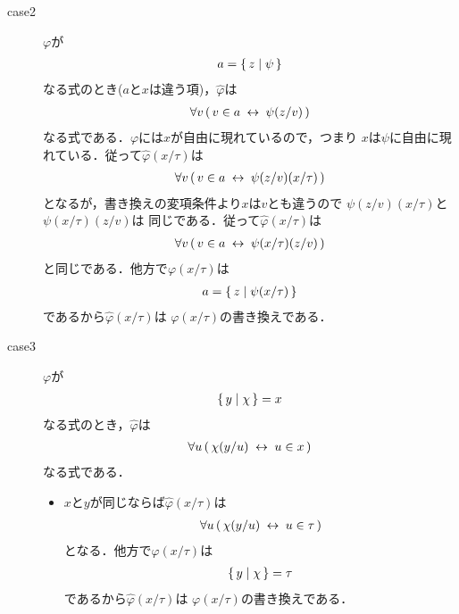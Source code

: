 \begin{metaprf}
\begin{description}
\begin{description}
					\item[case2] $\varphi$が
						\begin{align}
							a = \{\, z \mid \psi\, \}
						\end{align}
						なる式のとき($a$と$x$は違う項)，$\widehat{\varphi}$は
						\begin{align}
							\forall v\, (\, v \in a \hspace{0.25em}\leftrightarrow\hspace{0.25em} \psi(z/v)\, )
						\end{align}
						なる式である．$\varphi$には$x$が自由に現れているので，つまり
						$x$は$\psi$に自由に現れている．従って$\widehat{\varphi}(x/\tau)$は
						\begin{align}
							\forall v\, (\, v \in a \hspace{0.25em}\leftrightarrow\hspace{0.25em} \psi(z/v)(x/\tau)\, )
						\end{align}
						となるが，書き換えの変項条件より$x$は$v$とも違うので
						$\psi(z/v)(x/\tau)$と$\psi(x/\tau)(z/v)$は
						同じである．従って$\widehat{\varphi}(x/\tau)$は
						\begin{align}
							\forall v\, (\, v \in a \hspace{0.25em}\leftrightarrow\hspace{0.25em} \psi(x/\tau)(z/v)\, )
						\end{align}
						と同じである．他方で$\varphi(x/\tau)$は
						\begin{align}
							a = \{\, z \mid \psi(x/\tau)\, \}
						\end{align}
						であるから$\widehat{\varphi}(x/\tau)$は
						$\varphi(x/\tau)$の書き換えである．
					
					\item[case3] $\varphi$が
						\begin{align}
							\{\, y \mid \chi\, \} = x
						\end{align}
						なる式のとき，$\widehat{\varphi}$は
						\begin{align}
							\forall u\, (\, \chi(y/u) \hspace{0.25em}\leftrightarrow\hspace{0.25em} u \in x\, )
						\end{align}
						なる式である．
						\begin{itemize}
							\item $x$と$y$が同じならば$\widehat{\varphi}(x/\tau)$は
								\begin{align}
									\forall u\, (\, \chi(y/u) \hspace{0.25em}\leftrightarrow\hspace{0.25em} u \in \tau\, )
								\end{align}
								となる．他方で$\varphi(x/\tau)$は
								\begin{align}
									\{\, y \mid \chi\, \} = \tau
								\end{align}
								であるから$\widehat{\varphi}(x/\tau)$は
								$\varphi(x/\tau)$の書き換えである．
								

\end{itemize}
\end{description}
\end{description}
\end{metaprf}
